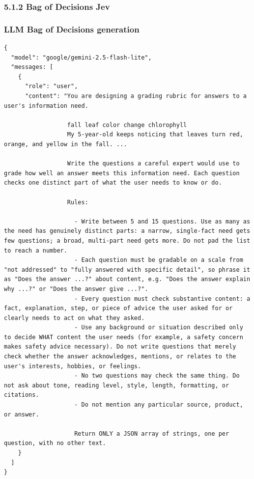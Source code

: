\documentclass[
  10pt,
]{article}
\begin{document}
\subsubsection{5.1.2 Bag of Decisions Jev}\label{bag-of-decisions-jev}

\subsubsection{LLM Bag of Decisions
generation}\label{llm-bag-of-decisions-generation}

\begin{lstlisting}
{
  "model": "google/gemini-2.5-flash-lite",
  "messages: [
    {
      "role": "user",
      "content": "You are designing a grading rubric for answers to a user's information need.

                  fall leaf color change chlorophyll
                  My 5-year-old keeps noticing that leaves turn red, orange, and yellow in the fall. ...

                  Write the questions a careful expert would use to grade how well an answer meets this information need. Each question checks one distinct part of what the user needs to know or do.

                  Rules:

                    - Write between 5 and 15 questions. Use as many as the need has genuinely distinct parts: a narrow, single-fact need gets few questions; a broad, multi-part need gets more. Do not pad the list to reach a number.
                    - Each question must be gradable on a scale from "not addressed" to "fully answered with specific detail", so phrase it as "Does the answer ...?" about content, e.g. "Does the answer explain why ...?" or "Does the answer give ...?".
                    - Every question must check substantive content: a fact, explanation, step, or piece of advice the user asked for or clearly needs to act on what they asked.
                    - Use any background or situation described only to decide WHAT content the user needs (for example, a safety concern makes safety advice necessary). Do not write questions that merely check whether the answer acknowledges, mentions, or relates to the user's interests, hobbies, or feelings.
                    - No two questions may check the same thing. Do not ask about tone, reading level, style, length, formatting, or citations.
                    - Do not mention any particular source, product, or answer.

                    Return ONLY a JSON array of strings, one per question, with no other text.
    }
  ]
}


\end{lstlisting}
\end{document}
